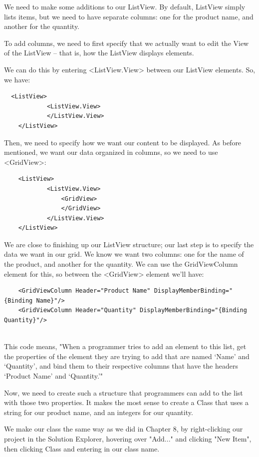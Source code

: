 \documentclass[oneside, openany] {book}
\begin{document}
We need to make some additions to our ListView. By default, ListView simply lists items, but we need to have separate columns: one for the product name, and another for the quantity.

To add columns, we need to first specify that we actually want to edit the View of the ListView -- that is, how the ListView displays elements.

We can do this by entering <ListView.View> between our ListView elements. So, we have:

\begin{verbatim}
  <ListView>
            <ListView.View>
            </ListView.View>
    </ListView>
\end{verbatim}

Then, we need to specify how we want our content to be displayed. As before mentioned, we want our data organized in columns, so we need to use <GridView>:

\begin{verbatim}
    <ListView>
            <ListView.View>
                <GridView>
                </GridView>
            </ListView.View>
    </ListView>
\end{verbatim}
We are close to finishing up our ListView structure; our last step is to specify the data we want in our grid. We know we want two columns: one for the name of the product, and another for the quantity. We can use the GridViewColumn element for this, so between the <GridView> element we'll have:

\begin{verbatim}
    <GridViewColumn Header="Product Name" DisplayMemberBinding="{Binding Name}"/>
    <GridViewColumn Header="Quantity" DisplayMemberBinding="{Binding Quantity}"/>
             
\end{verbatim}
This code means, "When a programmer tries to add an element to this list, get the properties of the element they are trying to add that are named `Name' and `Quantity', and bind them to their respective columns that have the headers `Product Name' and `Quantity.'"

Now, we need to create such a structure that programmers can add to the list with those two properties. It makes the most sense to create a Class that uses a string for our product name, and an integers for our quantity. 

We make our class the same way as we did in Chapter 8, by right-clicking our project in the Solution Explorer, hovering over "Add..." and clicking "New Item", then clicking Class and entering in our class name.
\end{document}
